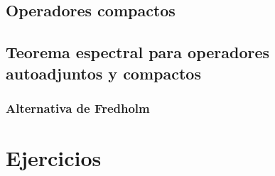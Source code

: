 \documentclass[bibnumbers, palatino]{apuntes}
\begin{document}
\section{Operadores compactos}

\section{Teorema espectral para operadores autoadjuntos y compactos}

\subsection{Alternativa de Fredholm}

\appendix

\chapter{Ejercicios}


\nocite{brezis2010functional,reed1980methods,rudin1991functional,ApuntesVarReal}
{}

\printindex
\end{document}
